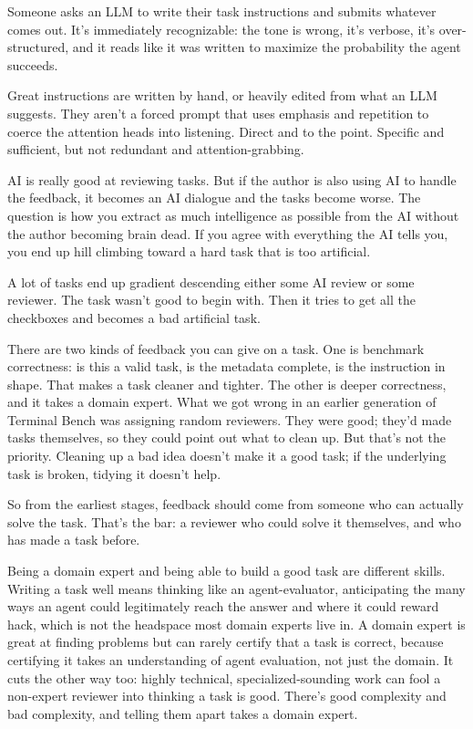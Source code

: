 \documentclass[11pt]{article}
\begin{document}
Someone asks an LLM to write their task instructions and submits whatever comes out. It's immediately recognizable: the tone is wrong, it's verbose, it's over-structured, and it reads like it was written to maximize the probability the agent succeeds.

Great instructions are written by hand, or heavily edited from what an LLM suggests. They aren’t a forced prompt that uses emphasis and repetition to coerce the attention heads into listening. Direct and to the point. Specific and sufficient, but not redundant and attention-grabbing.

AI is really good at reviewing tasks. But if the author is also using AI to handle the feedback, it becomes an AI dialogue and the tasks become worse. The question is how you extract as much intelligence as possible from the AI without the author becoming brain dead. If you agree with everything the AI tells you, you end up hill climbing toward a hard task that is too artificial.

A lot of tasks end up gradient descending either some AI review or some reviewer. The task wasn't good to begin with. Then it tries to get all the checkboxes and becomes a bad artificial task.

There are two kinds of feedback you can give on a task. One is benchmark correctness: is this a valid task, is the metadata complete, is the instruction in shape. That makes a task cleaner and tighter. The other is deeper correctness, and it takes a domain expert. What we got wrong in an earlier generation of Terminal Bench was assigning random reviewers. They were good; they'd made tasks themselves, so they could point out what to clean up. But that's not the priority. Cleaning up a bad idea doesn't make it a good task; if the underlying task is broken, tidying it doesn't help.

So from the earliest stages, feedback should come from someone who can actually solve the task. That's the bar: a reviewer who could solve it themselves, and who has made a task before.

Being a domain expert and being able to build a good task are different skills. Writing a task well means thinking like an agent-evaluator, anticipating the many ways an agent could legitimately reach the answer and where it could reward hack, which is not the headspace most domain experts live in. A domain expert is great at finding problems but can rarely certify that a task is correct, because certifying it takes an understanding of agent evaluation, not just the domain. It cuts the other way too: highly technical, specialized-sounding work can fool a non-expert reviewer into thinking a task is good. There's good complexity and bad complexity, and telling them apart takes a domain expert.
\end{document}
